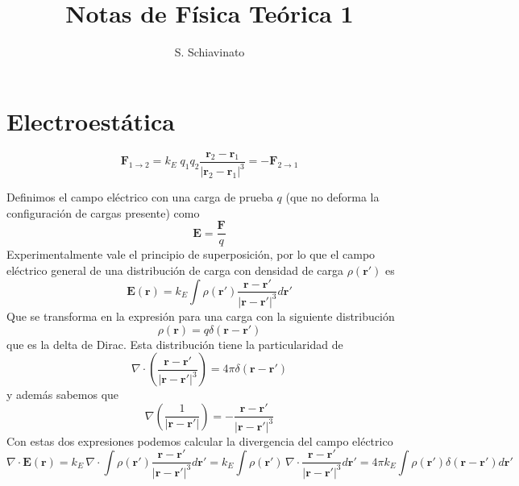 \documentclass{article}
\title{Notas de Física Teórica 1}
\author{S. Schiavinato}
\date{}
\numberwithin{equation}{section} %
\renewcommand{\vec}[1]{\boldsymbol{#1}}
\begin{document}
\maketitle
\tableofcontents

\section{Electroestática}

\begin{equation}
\vec{F}_{1\to2} = k_E \; q_1 q_2\frac{\vec{r}_2 - \vec{r}_1}{|\vec{r}_2 - \vec{r}_1|^3} = - \vec{F}_{2\to1}
\label{eq:electroestatica_coulomb}
\end{equation}

Definimos el campo eléctrico con una carga de prueba $q$ (que no deforma la configuración de cargas presente) como
\begin{equation}
\vec{E} = \frac{\vec{F}}{q}
\label{eq:campo_electrico}
\end{equation}
Experimentalmente vale el principio de superposición, por lo que el campo eléctrico general de una distribución de carga con densidad de carga $\rho(\vec{r}')$ es 
\begin{equation}
\vec{E}(\vec{r}) = k_E \int \rho(\vec{r}') \frac{\vec{r} - \vec{r}'}{|\vec{r} - \vec{r}'|^3} d\vec{r}'
\label{eq:campo_electrico_dist_carga}
\end{equation}
Que se transforma en la expresión para una carga con la siguiente distribución
\begin{equation}
 \rho(\vec{r}) = q \delta(\vec{r} - \vec{r}')
\end{equation}
que es la delta de Dirac. Esta distribución tiene la particularidad de
\begin{equation}
\nabla \cdot \left(\frac{\vec{r} - \vec{r}'}{|\vec{r} - \vec{r}'|^3}\right) = 4\pi\delta(\vec{r} - \vec{r}')
\end{equation}
y además sabemos que
\begin{equation}
\nabla \left(\frac{1}{|\vec{r} - \vec{r}'|}\right) = -\frac{\vec{r} - \vec{r}'}{|\vec{r} - \vec{r}'|^3}
\end{equation}
Con estas dos expresiones podemos calcular la divergencia del campo eléctrico
\[ \nabla \cdot \vec{E}(\vec{r}) = k_E \, \nabla \cdot \int \rho(\vec{r}') \frac{\vec{r} - \vec{r}'}{|\vec{r} - \vec{r}'|^3} d\vec{r}' = k_E \int \rho(\vec{r}') \, \nabla \cdot \frac{\vec{r} - \vec{r}'}{|\vec{r} - \vec{r}'|^3} d\vec{r}' = 4\pi k_E \int \rho(\vec{r}') \delta(\vec{r} - \vec{r}') d\vec{r}'\]
\end{document}
